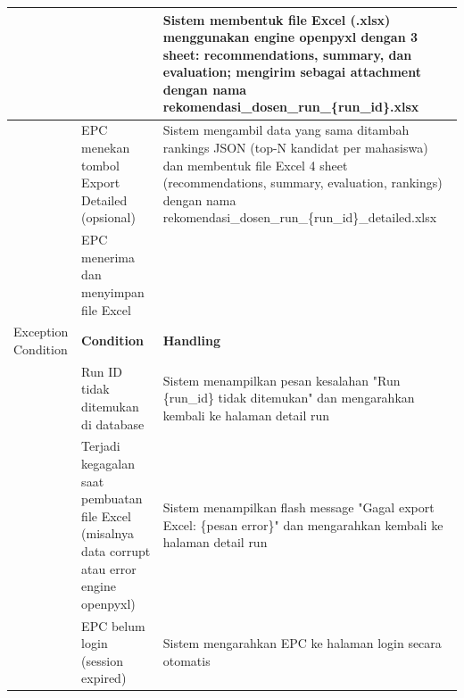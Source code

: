 \begin{longtable}{|p{3.5cm}|p{4.5cm}|p{5cm}|}
\hline
 & & Sistem membentuk file Excel (.xlsx) menggunakan engine openpyxl dengan 3 sheet: recommendations, summary, dan evaluation; mengirim sebagai attachment dengan nama rekomendasi\_dosen\_run\_\{run\_id\}.xlsx \\
\hline
 & EPC menekan tombol Export Detailed (opsional) & Sistem mengambil data yang sama ditambah rankings JSON (top-N kandidat per mahasiswa) dan membentuk file Excel 4 sheet (recommendations, summary, evaluation, rankings) dengan nama rekomendasi\_dosen\_run\_\{run\_id\}\_detailed.xlsx \\
\hline
 & EPC menerima dan menyimpan file Excel & \\
\hline
Exception Condition & \textbf{Condition} & \textbf{Handling} \\
\hline
 & Run ID tidak ditemukan di database & Sistem menampilkan pesan kesalahan "Run \{run\_id\} tidak ditemukan" dan mengarahkan kembali ke halaman detail run \\
\hline
 & Terjadi kegagalan saat pembuatan file Excel (misalnya data corrupt atau error engine openpyxl) & Sistem menampilkan flash message "Gagal export Excel: \{pesan error\}" dan mengarahkan kembali ke halaman detail run \\
\hline
 & EPC belum login (session expired) & Sistem mengarahkan EPC ke halaman login secara otomatis \\
\hline
\end{longtable}

